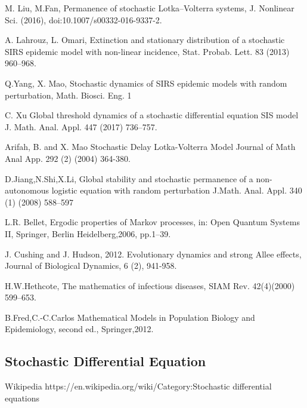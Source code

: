 \begin{thebibliography}{00}
 M. Liu, M.Fan, 
\newblock Permanence of stochastic Lotka–Volterra systems,
\newblock J. Nonlinear Sci. (2016), doi:10.1007/s00332-016-9337-2.

 A. Lahrouz, L. Omari,
\newblock Extinction and stationary distribution of a stochastic SIRS epidemic model with non-linear incidence,
\newblock Stat. Probab. Lett. 83 (2013) 960–968.

 Q.Yang, X. Mao,
\newblock Stochastic dynamics of SIRS epidemic models with random perturbation,
\newblock Math. Biosci. Eng. 1

 C. Xu
\newblock Global threshold dynamics of a stochastic differential equation SIS model
\newblock J. Math. Anal. Appl. 447 (2017) 736–757.

Arifah, B. and X. Mao 
\newblock Stochastic Delay Lotka-Volterra Model 
\newblock Journal of Math Anal App. 292 (2) (2004) 364-380.

 D.Jiang,N.Shi,X.Li,
\newblock Global stability and stochastic permanence of a non-autonomous logistic equation with random perturbation
\newblock J.Math. Anal. Appl. 340 (1) (2008) 588–597

L.R. Bellet,
\newblock Ergodic properties of Markov processes, in: Open Quantum Systems II,
\newblock Springer, Berlin Heidelberg,2006, pp.1–39.

 J. Cushing and J. Hudson, 2012. 
\newblock Evolutionary dynamics and strong Allee effects,
\newblock Journal  of  Biological Dynamics, 6 (2), 941-958.

H.W.Hethcote,
\newblock The mathematics of infectious diseases,
\newblock SIAM Rev. 42(4)(2000) 599–653.

B.Fred,C.-C.Carlos
\newblock Mathematical Models in Population Biology and Epidemiology,
\newblock second ed., Springer,2012.

\subsection{Stochastic Differential Equation}

 Wikipedia
\newblock https://en.wikipedia.org/wiki/Category:Stochastic differential equations


\end{thebibliography}

